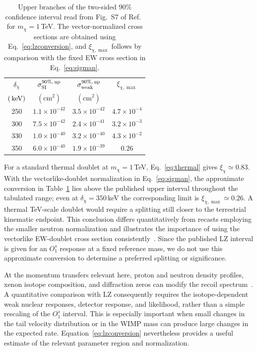 \documentclass[aps,prd,reprint,preprintnumbers,superscriptaddress,nofootinbib,floatfix]{revtex4-2}
\newcommand{\dchi}{\delta_\chi}
\begin{document}
\begin{table}[t]
    \centering
    \begin{tabular}{cccc}
    \toprule
    $\dchi$ & $\sigma_{\rm SI}^{90\%,\,\rm up}$ & $\sigma_{\rm weak}^{90\%,\,\rm up}$ & $\xi_{\chi,\max}$\\
    $({\rm\,keV})$ & $(\mathrm{cm^2})$ & $(\mathrm{cm^2})$ & \\
    \midrule
    250 & $1.1\times10^{-42}$ & $3.5\times10^{-42}$ & $4.7\times10^{-4}$\\
    300 & $7.5\times10^{-42}$ & $2.4\times10^{-41}$ & $3.2\times10^{-3}$\\
    330 & $1.0\times10^{-40}$ & $3.2\times10^{-40}$ & $4.3\times10^{-2}$\\
    350 & $6.0\times10^{-40}$ & $1.9\times10^{-39}$ & $0.26$\\
    \bottomrule
    \end{tabular}
    \caption{Upper branches of the two-sided $90\%$ confidence interval read from Fig.~S7 of Ref.~\cite{LZ:2026axp} for $m_\chi=1$\,TeV. The vector-normalized cross sections are obtained using Eq.~\eqref{eq:lzconversion}, and $\xi_{\chi,\max}$ follows by comparison with the fixed EW cross section in Eq.~\eqref{eq:sigman}.}
    \label{tab:lzread}
\end{table}

For a standard thermal doublet at $m_\chi=1$\,TeV, Eq.~\eqref{eq:thermal} gives $\xi_\chi\simeq0.83$. With the vectorlike-doublet normalization in Eq.~\eqref{eq:sigman}, the approximate conversion in Table~\ref{tab:lzread} lies above the published upper interval throughout the tabulated range; even at $\dchi=350$\,keV the corresponding limit is $\xi_{\chi,\max}\simeq0.26$. A thermal TeV-scale doublet would require a splitting still closer to the terrestrial kinematic endpoint. This conclusion differs quantitatively from recasts employing the smaller neutron normalization and illustrates the importance of using the vectorlike EW-doublet cross section consistently~\cite{Pospelov:2026ewn}. Since the published LZ interval is given for an $O_1^s$ response at a fixed reference mass, we do not use this approximate conversion to determine a preferred splitting or significance.

At the momentum transfers relevant here, proton and neutron density profiles, xenon isotope composition, and diffraction zeros can modify the recoil spectrum~\cite{Anand:2013yka}. A quantitative comparison with LZ consequently requires the isotope-dependent weak nuclear responses, detector response, and likelihood, rather than a simple rescaling of the $O_1^s$ interval. This is especially important when small changes in the tail velocity distribution or in the WIMP mass can produce large changes in the expected rate. Equation~\eqref{eq:lzconversion} nevertheless provides a useful estimate of the relevant parameter region and normalization.
\end{document}
